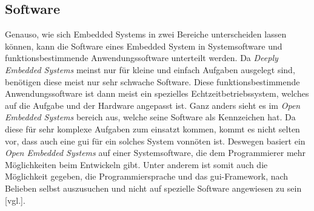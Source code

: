 \subsection{Software}
\label{subsec:EmbeddedSoftware}
Genauso, wie sich Embedded Systems in zwei Bereiche unterscheiden lassen können, kann die
Software eines Embedded System in Systemsoftware und funktionsbestimmende
Anwendungssoftware unterteilt werden. Da \emph{Deeply Embedded Systems} meinst nur für kleine und
einfach Aufgaben ausgelegt sind, benötigen diese meist nur sehr schwache Software. Diese
funktionsbestimmende Anwendungssoftware ist dann meist ein spezielles Echtzeitbetriebssystem,
welches auf die Aufgabe und der Hardware angepasst ist.
\newline
\newline
Ganz anders sieht es im \emph{Open Embedded Systems} bereich aus, welche seine Software als
Kennzeichen hat. Da diese für sehr komplexe Aufgaben zum einsatzt kommen, kommt es nicht selten
vor, dass auch eine \ac{gui} für ein solches System vonnöten ist. Deswegen basiert ein \emph{Open
Embedded Systems} auf einer Systemsoftware, die dem Programmierer mehr Möglichkeiten beim
Entwickeln gibt. Unter anderem ist somit auch die Möglichkeit gegeben, die Programmiersprache und
das \ac{gui}-Framework, nach Belieben selbst auszusuchen und nicht auf spezielle Software angewiesen
zu sein \cite{EmbeddedLinuxQuade}[vgl.].